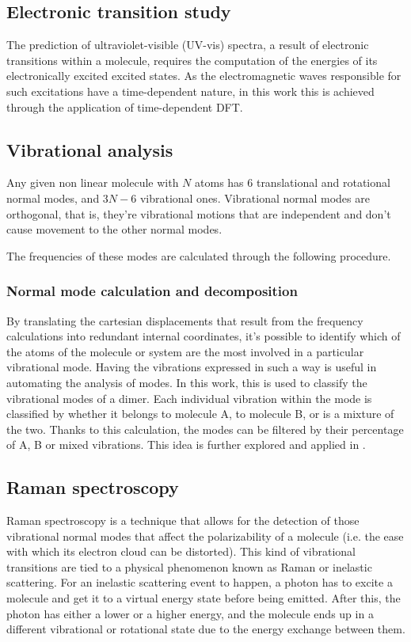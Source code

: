 \subsection{Electronic transition study}
The prediction of ultraviolet-visible (UV-vis) spectra, a result of electronic transitions within a molecule, requires the computation of the energies of its electronically excited excited states.
As the electromagnetic waves responsible for such excitations have a time-dependent nature, in this work this is achieved through the application of time-dependent DFT.

\subsection{Vibrational analysis}
Any given non linear molecule with $N$ atoms has 6 translational and rotational normal modes, and $3N-6$ vibrational ones.
Vibrational normal modes are orthogonal, that is, they're vibrational motions that are independent and don't cause movement to the other normal modes.

The frequencies of these modes are calculated through the following procedure.
\blindtext[2]

\subsubsection{Normal mode calculation and decomposition}
By translating the cartesian displacements that result from the frequency calculations into redundant internal coordinates, it's possible to identify which of the atoms of the molecule or system are the most involved in a particular vibrational mode.
Having the vibrations expressed in such a way is useful in automating the analysis of modes.
In this work, this is used to classify the vibrational modes of a dimer.
Each individual vibration within the mode is classified by whether it belongs to molecule A, to molecule B, or is a mixture of the two.
Thanks to this calculation, the modes can be filtered by their percentage of A, B or mixed vibrations.
This idea is further explored and applied in .

\subsection{Raman spectroscopy}
Raman spectroscopy is a technique that allows for the detection of those vibrational normal modes that affect the polarizability of a molecule (i.e. the ease with which its electron cloud can be distorted).
This kind of vibrational transitions are tied to a physical phenomenon known as Raman or inelastic scattering.
For an inelastic scattering event to happen, a photon has to excite a molecule and get it to a virtual energy state before being emitted.
After this, the photon has either a lower or a higher energy, and the molecule ends up in a different vibrational or rotational state due to the energy exchange between them.

